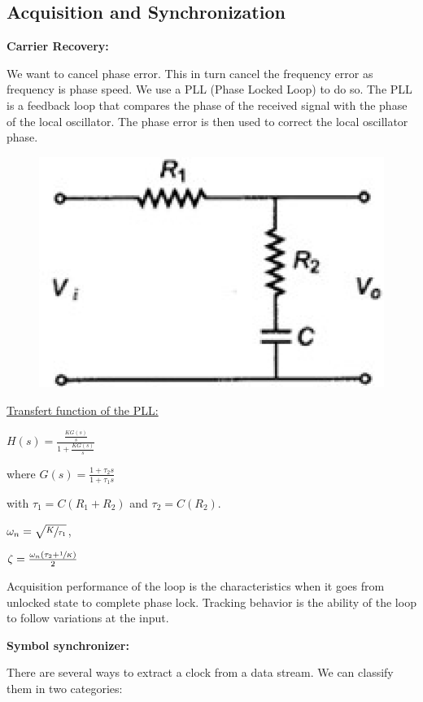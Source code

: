 \subsection*{Acquisition and Synchronization}
\textbf{Carrier Recovery:}

We want to cancel phase error. This in turn cancel
the frequency error as frequency is phase speed. We use a PLL (Phase Locked Loop)
to do so. The PLL is a feedback loop that compares the phase of the received signal
with the phase of the local oscillator. The phase error is then used to correct
the local oscillator phase.

\setlength{\intextsep}{-10pt}
\begin{figure}
    \includegraphics[width=\linewidth]{images/pll_loop_filter.png}
\end{figure}
\underline{Transfert function of the PLL:}

$H(s)=\frac{\frac{KG(s)}{s}}{1+\frac{KG(s)}{s}}$

where $G(s)=\frac{1+\tau_2s}{1+\tau_1s}$

with $\tau_1=C(R_1+R_2)$ and $\tau_2=C(R_2)$.

$\omega_n=\sqrt{\sfrac{K}{\tau_1}}$,

$\zeta=\frac{\omega_n(\tau_2+\sfrac{1}{K})}{2}$

Acquisition performance of the loop is the characteristics when it goes from unlocked state to
complete phase lock. Tracking behavior is the ability of the loop to follow variations at the
input.

\textbf{Symbol synchronizer:}

There are several ways to extract a clock from a data stream.
We can classify them in two categories:

